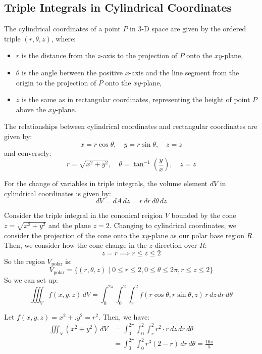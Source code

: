 \documentclass[11pt]{report}
\begin{document}
\subsection{Triple Integrals in Cylindrical Coordinates}
\begin{definition}
    The cylindrical coordinates of a point $P$ in 3-D space are given by the ordered triple $(r, \theta, z)$, where:
    \begin{itemize}
        \item $r$ is the distance from the $z$-axis to the projection of $P$ onto the $xy$-plane,
        \item $\theta$ is the angle between the positive $x$-axis and the line segment from the origin to the projection of $P$ onto the $xy$-plane,
        \item $z$ is the same as in rectangular coordinates, representing the height of point $P$ above the $xy$-plane.
    \end{itemize}
    The relationships between cylindrical coordinates and rectangular coordinates are given by:
    \begin{equation}
        x = r \cos \theta, \quad y = r \sin \theta, \quad z = z
    \end{equation}
    and conversely:
    \begin{equation}
        r = \sqrt{x^2 + y^2}, \quad \theta = \tan^{-1}\left(\frac{y}{x}\right), \quad z = z
    \end{equation}

    For the change of variables in triple integrals, the volume element $dV$ in cylindrical coordinates is given by:
    \begin{equation}
        dV = dA \, dz = r \, dr \, d\theta \, dz
    \end{equation}
\end{definition}

\begin{example}
    Consider the triple integral in the cononical reigion $V$ bounded by the cone $z = \sqrt{x^2 + y^2}$ and the plane $z=2$. Changing to cylindrical coordinates, we consider the projection of the cone onto the $xy$-plane as our polar base region $R$. Then, we consider how the cone change in the $z$ direction over $R$:
    $$
        z = r \implies r \le z \le 2
    $$
    So the region $V_{\text{polar}}$ is:
    $$
    V_{\text{polar}} = \{(r, \theta, z) \mid 0 \le r \le 2, 0 \le \theta \le 2\pi, r \le z \le 2\}
    $$
    So we can set up:
    $$
        \iiint_V f(x,y,z) \, dV = \int_0^{2\pi} \int_0^2 \int_r^2 f(r \cos \theta, r \sin \theta, z) \, r \, dz \, dr \, d\theta
    $$

    Let $f(x,y,z) = x^2 +. y^2 = r^2$. Then, we have:
    \begin{align*}
        \iiint_V (x^2 + y^2) \, dV &= \int_0^{2\pi} \int_0^2 \int_r^2 r^2 \cdot r \, dz \, dr \, d\theta \\
        &= \int_0^{2\pi} \int_0^2 r^3 (2 - r) \, dr \, d\theta = \frac{16\pi}{5}
    \end{align*}

\end{example}
\end{document}
